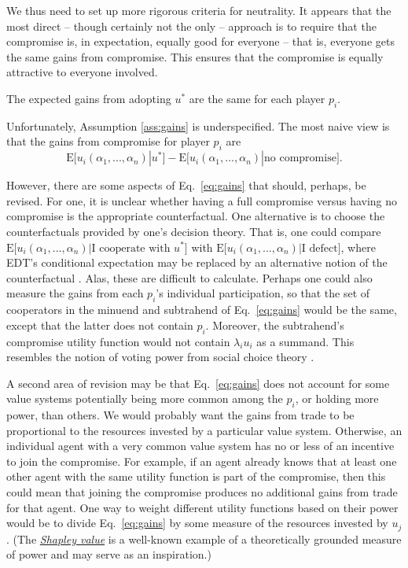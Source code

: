 We thus need to set up more rigorous criteria for neutrality. It appears
that the most direct -- though certainly not the only -- approach is to
require that the compromise is, in expectation, equally good for
everyone -- that is, everyone gets the same gains from compromise. This
ensures that the compromise is equally attractive to everyone involved.

\begin{assumption}
\label{ass:gains}
The expected gains from adopting \(u^{*}\) are the same for each player \(p_{i}\).
\end{assumption}

Unfortunately, Assumption \ref{ass:gains} is underspecified. The most naive view is that the gains
from compromise for player \(p_{i}\) are
\begin{equation}
\mathrm{E}\lbrack u_{i}(\alpha_{1},...,\alpha_{n})|u^{*}\rbrack - \mathrm{E}\lbrack
u_{i}(\alpha_{1},...,\alpha_{n})|\text{no compromise}\rbrack.
    \label{eq:gains}
\end{equation}

However, there are some aspects of Eq.~\eqref{eq:gains} that should, perhaps, be revised.
For one, it is unclear whether having a full compromise versus having no
compromise is the appropriate counterfactual. One alternative is to
choose the counterfactuals provided by one's decision theory. That is,
one could compare
\(\mathrm{E}\lbrack u_{i}(\alpha_{1},...,\alpha_{n})|\text{I cooperate with }u^{*}\rbrack\)
with \(\mathrm{E}\lbrack u_{i}(\alpha_{1},...,\alpha_{n})|\text{I defect}\rbrack\),
where EDT's conditional expectation may be replaced by an alternative
notion of the counterfactual
\parencite{Gibbard1978-nw,Hintze2014-ha}. Alas, these are
difficult to calculate. Perhaps one could also measure the gains from
each \(p_i\)'s individual participation, so that the set of
cooperators in the minuend and subtrahend of Eq.~\eqref{eq:gains} would be the same,
except that the latter does not contain \(p_{i}\). Moreover, the
subtrahend's compromise utility function would not contain
\(\lambda_{i}u_{i}\) as a summand. This resembles the notion of voting
power from social choice theory
\parencite{Cotton-Barratt2013-ql,Felsenthal1998-zv}.

A second area of revision may be that Eq.~\eqref{eq:gains} does not account for some
value systems potentially being more common among the \(p_{i}\), or
holding more power, than others. We would probably want the gains from
trade to be proportional to the resources invested by a particular value
system. Otherwise, an individual agent with a very common value system
has no or less of an incentive to join the compromise. For example, if
an agent already knows that at least one other agent with the same
utility function is part of the compromise, then this could mean that
joining the compromise produces no additional gains from trade for that
agent. One way to weight different utility functions based on their
power would be to divide Eq.~\eqref{eq:gains} by some measure of the resources invested
by \(u_{j}\). (The
\href{https://en.wikipedia.org/wiki/Shapley_value}{\emph{Shapley value}}
is a well-known example of a theoretically grounded measure of power and
may serve as an inspiration.)

